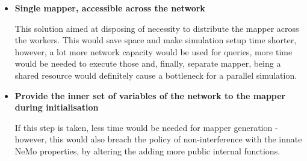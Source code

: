 \begin{itemize}

\item{\textbf{Single mapper, accessible across the network}}

This solution aimed at disposing of necessity to distribute the mapper across the workers. This would save space and make simulation setup time shorter, however, a lot more network capacity would be used for queries, more time would be needed to execute those and, finally, separate mapper, being a shared resource would definitely cause a bottleneck for a parallel simulation.

\item{\textbf{Provide the inner set of variables of the network to the mapper during initialisation}}

If this step is taken, less time would be needed for mapper generation - however, this would also breach the policy of non-interference with the innate NeMo properties, by altering the adding more public internal functions.

\end{itemize}
